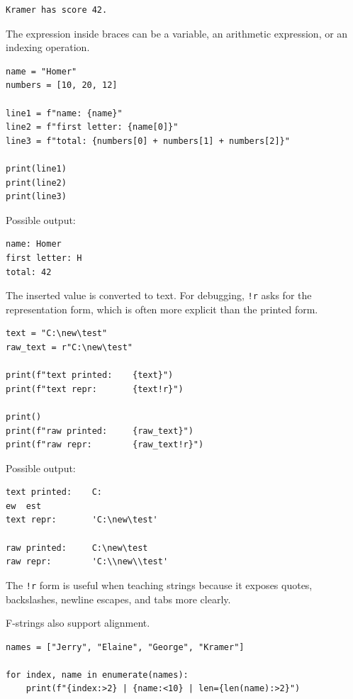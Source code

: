\begin{verbatim}
Kramer has score 42.
\end{verbatim}

The expression inside braces can be a variable, an arithmetic expression, or an indexing operation.

\begin{verbatim}
name = "Homer"
numbers = [10, 20, 12]

line1 = f"name: {name}"
line2 = f"first letter: {name[0]}"
line3 = f"total: {numbers[0] + numbers[1] + numbers[2]}"

print(line1)
print(line2)
print(line3)
\end{verbatim}

Possible output:

\begin{verbatim}
name: Homer
first letter: H
total: 42
\end{verbatim}

The inserted value is converted to text. For debugging, \texttt{!r} asks for the representation form, which is often more explicit than the printed form.

\begin{verbatim}
text = "C:\new\test"
raw_text = r"C:\new\test"

print(f"text printed:    {text}")
print(f"text repr:       {text!r}")

print()
print(f"raw printed:     {raw_text}")
print(f"raw repr:        {raw_text!r}")
\end{verbatim}

Possible output:

\begin{verbatim}
text printed:    C:
ew	est
text repr:       'C:\new\test'

raw printed:     C:\new\test
raw repr:        'C:\\new\\test'
\end{verbatim}

The \texttt{!r} form is useful when teaching strings because it exposes quotes, backslashes, newline escapes, and tabs more clearly.

F-strings also support alignment.

\begin{verbatim}
names = ["Jerry", "Elaine", "George", "Kramer"]

for index, name in enumerate(names):
    print(f"{index:>2} | {name:<10} | len={len(name):>2}")
\end{verbatim}

